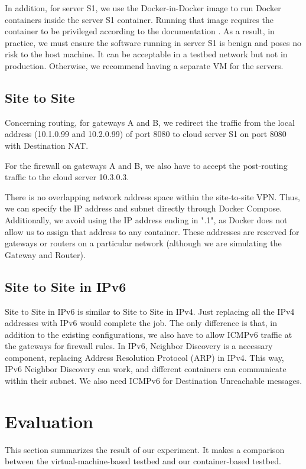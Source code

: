 \documentclass[article]{aaltoseries}
\begin{document}
In addition, for server S1, we use the Docker-in-Docker image to run Docker containers inside the server S1 container. Running that image requires the container to be privileged according to the documentation \cite{Docker}. As a result, in practice, we must ensure the software running in server S1 is benign and poses no risk to the host machine. It can be acceptable in a testbed network but not in production. Otherwise, we recommend having a separate VM for the servers.

\subsection{Site to Site}

Concerning routing, for gateways A and B, we redirect the traffic from the local address (10.1.0.99 and 10.2.0.99) of port 8080 to cloud server S1 on port 8080 with Destination NAT.

For the firewall on gateways A and B, we also have to accept the post-routing traffic to the cloud server 10.3.0.3.

There is no overlapping network address space within the site-to-site VPN. Thus, we can specify the IP address and subnet directly through Docker Compose. Additionally, we avoid using the IP address ending in ".1", as Docker does not allow us to assign that address to any container. These addresses are reserved for gateways or routers on a particular network (although we are simulating the Gateway and Router).

\subsection{Site to Site in IPv6}

Site to Site in IPv6 is similar to Site to Site in IPv4. Just replacing all the IPv4 addresses with IPv6 would complete the job. The only difference is that, in addition to the existing configurations, we also have to allow ICMPv6 traffic at the gateways for firewall rules. In IPv6, Neighbor Discovery is a necessary component, replacing Address Resolution Protocol (ARP) in IPv4. This way, IPv6 Neighbor Discovery can work, and different containers can communicate within their subnet. We also need ICMPv6 for Destination Unreachable messages.


\section{Evaluation}
This section summarizes the result of our experiment. It makes a comparison between the virtual-machine-based testbed and our container-based testbed.
\end{document}
